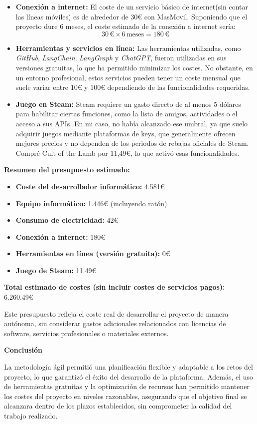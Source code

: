 \begin{itemize}
    \item \textbf{Conexión a internet:} El coste de un servicio básico de internet(sin contar las líneas móviles) es de alrededor de 30€ con MasMovil. Suponiendo que el proyecto dure 6 meses, el coste estimado de la conexión a internet sería:
    \[
    30 \, \text{€} \times 6 \, \text{meses} = 180 \, \text{€}
    \]

    \item \textbf{Herramientas y servicios en línea:} Las herramientas utilizadas, como \textit{GitHub}, \textit{LangChain}, \textit{LangGraph} y \textit{ChatGPT}, fueron utilizadas en sus versiones gratuitas, lo que ha permitido minimizar los costes. No obstante, en un entorno profesional, estos servicios pueden tener un coste mensual que suele variar entre 10€ y 100€ dependiendo de las funcionalidades requeridas.

    \item \textbf{Juego en Steam:} Steam requiere un gasto directo de al menos 5 dólares para habilitar ciertas funciones, como la lista de amigos, actividades o el acceso a sus APIs. En mi caso, no había alcanzado ese umbral, ya que suelo adquirir juegos mediante plataformas de keys, que generalmente ofrecen mejores precios y no dependen de los periodos de rebajas oficiales de Steam. Compré Cult of the Lamb por 11,49€, lo que activó esas funcionalidades.
    
\end{itemize}

\textbf{Resumen del presupuesto estimado:}

\begin{itemize}
    \item \textbf{Coste del desarrollador informático:} 4.581€
    \item \textbf{Equipo informático:} 1.446€ (incluyendo ratón)
    \item \textbf{Consumo de electricidad:} 42€
    \item \textbf{Conexión a internet:} 180€
    \item \textbf{Herramientas en línea (versión gratuita):} 0€
    \item \textbf{Juego de Steam:} 11.49€
\end{itemize}

\textbf{Total estimado de costes (sin incluir costes de servicios pagos):} 6.260.49€

Este presupuesto refleja el coste real de desarrollar el proyecto de manera autónoma, sin considerar gastos adicionales relacionados con licencias de software, servicios profesionales o materiales externos.

\textbf{Conclusión}


La metodología ágil permitió una planificación flexible y adaptable a los retos del proyecto, lo que garantizó el éxito del desarrollo de la plataforma. Además, el uso de herramientas gratuitas y la optimización de recursos han permitido mantener los costes del proyecto en niveles razonables, asegurando que el objetivo final se alcanzara dentro de los plazos establecidos, sin comprometer la calidad del trabajo realizado.


